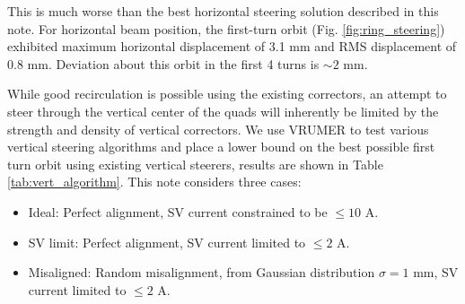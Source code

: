 This is much worse than the best horizontal steering solution described in this note. For horizontal beam position, the first-turn orbit (Fig. \ref{fig:ring_steering}) exhibited maximum horizontal displacement of 3.1 mm and RMS displacement of 0.8 mm. Deviation about this orbit in the first 4 turns is $\sim2$ mm. 


While good recirculation is possible using the existing correctors, an attempt to steer through the vertical center of the quads will inherently be limited by the strength and density of vertical correctors. We use VRUMER to test various vertical steering algorithms and place a lower bound on the best possible first turn orbit using existing vertical steerers, results are shown in Table \ref{tab:vert_algorithm}. This note considers three cases: 

\begin{itemize} 
\item Ideal: Perfect alignment, SV current constrained to be $\le10$ A. 
\item SV limit: Perfect alignment, SV current limited to $\le2$ A.
\item Misaligned: Random misalignment, from Gaussian distribution $\sigma=1$ mm, SV current limited to $\le2$ A.
\end{itemize}



